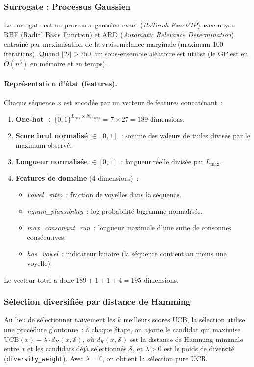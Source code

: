 \documentclass[10pt]{article}
\begin{document}
\subsubsection{Surrogate : Processus Gaussien}

Le surrogate est un processus gaussien exact (\emph{BoTorch ExactGP}) avec noyau RBF (Radial Basis Function) et ARD (\emph{Automatic Relevance Determination}), entraîné par maximisation de la vraisemblance marginale (maximum 100 itérations). Quand $|\mathcal{D}| > 750$, un sous-ensemble aléatoire est utilisé (le GP est en $O(n^3)$ en mémoire et en temps).

\paragraph{Représentation d'état (features).}
Chaque séquence $x$ est encodée par un vecteur de features concaténant~:
\begin{enumerate}[noitemsep]
  \item \textbf{One-hot} $\in \{0,1\}^{L_{\max} \times N_{\text{tokens}}}$ = $7 \times 27 = 189$ dimensions.
  \item \textbf{Score brut normalisé} $\in [0,1]$~: somme des valeurs de tuiles divisée par le maximum observé.
  \item \textbf{Longueur normalisée} $\in [0,1]$~: longueur réelle divisée par $L_{\max}$.
  \item \textbf{Features de domaine} (4 dimensions)~:
    \begin{itemize}[noitemsep]
      \item \emph{vowel\_ratio}~: fraction de voyelles dans la séquence.
      \item \emph{ngram\_plausibility}~: log-probabilité bigramme normalisée.
      \item \emph{max\_consonant\_run}~: longueur maximale d'une suite de consonnes consécutives.
      \item \emph{has\_vowel}~: indicateur binaire (la séquence contient au moins une voyelle).
    \end{itemize}
\end{enumerate}
Le vecteur total a donc $189 + 1 + 1 + 4 = 195$ dimensions.

\subsubsection{Sélection diversifiée par distance de Hamming}

Au lieu de sélectionner naïvement les $k$ meilleurs scores UCB, la sélection utilise une procédure gloutonne~: à chaque étape, on ajoute le candidat qui maximise $\text{UCB}(x) - \lambda \cdot d_H(x, \mathcal{S})$, où $d_H(x, \mathcal{S})$ est la distance de Hamming minimale entre $x$ et les candidats déjà sélectionnés $\mathcal{S}$, et $\lambda > 0$ est le poids de diversité (\texttt{diversity\_weight}). Avec $\lambda = 0$, on obtient la sélection pure UCB.
\end{document}
